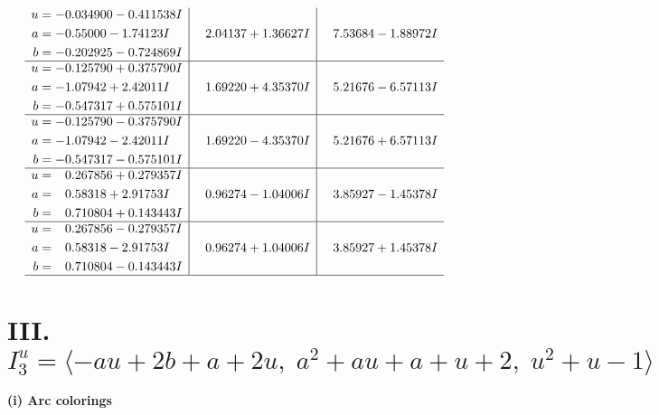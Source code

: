 \documentclass[1p]{elsarticle_modified}
\theoremstyle{definition}
\begin{document}
$$\begin{array}{c|c|c}
\begin{aligned}
u &= -0.034900 - 0.411538 I \\
a &= -0.55000 - 1.74123 I \\
b &= -0.202925 - 0.724869 I\end{aligned}
 & \phantom{-}2.04137 + 1.36627 I & \phantom{-}7.53684 - 1.88972 I \\ \hline\begin{aligned}
u &= -0.125790 + 0.375790 I \\
a &= -1.07942 + 2.42011 I \\
b &= -0.547317 + 0.575101 I\end{aligned}
 & \phantom{-}1.69220 + 4.35370 I & \phantom{-}5.21676 - 6.57113 I \\ \hline\begin{aligned}
u &= -0.125790 - 0.375790 I \\
a &= -1.07942 - 2.42011 I \\
b &= -0.547317 - 0.575101 I\end{aligned}
 & \phantom{-}1.69220 - 4.35370 I & \phantom{-}5.21676 + 6.57113 I \\ \hline\begin{aligned}
u &= \phantom{-}0.267856 + 0.279357 I \\
a &= \phantom{-}0.58318 + 2.91753 I \\
b &= \phantom{-}0.710804 + 0.143443 I\end{aligned}
 & \phantom{-}0.96274 - 1.04006 I & \phantom{-}3.85927 - 1.45378 I \\ \hline\begin{aligned}
u &= \phantom{-}0.267856 - 0.279357 I \\
a &= \phantom{-}0.58318 - 2.91753 I \\
b &= \phantom{-}0.710804 - 0.143443 I\end{aligned}
 & \phantom{-}0.96274 + 1.04006 I & \phantom{-}3.85927 + 1.45378 I\\
 \hline 
 \end{array}$$\newpage\newpage\renewcommand{\arraystretch}{1}
\centering \section*{III. $I^u_{3}= \langle - a u+2 b+a+2 u,\;a^2+a u+a+u+2,\;u^2+u-1 \rangle$}
\flushleft \textbf{(i) Arc colorings}\\
\end{document}
